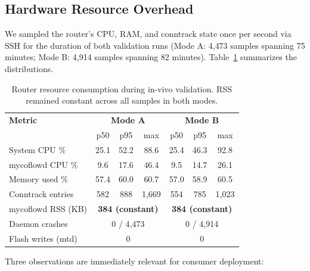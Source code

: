 \documentclass[journal,onecolumn]{IEEEtran}
\begin{document}
\subsection{Hardware Resource Overhead}
\label{sec:eval-resources}

We sampled the router's CPU, RAM, and conntrack state once per second
via SSH for the duration of both validation runs (Mode A: 4{,}473
samples spanning 75 minutes; Mode B: 4{,}914 samples spanning 82 minutes).
Table~\ref{tab:resources} summarizes the distributions.

\begin{table}[t]
\centering
\caption{Router resource consumption during in-vivo validation. RSS
remained constant across all samples in both modes.}
\label{tab:resources}
\begin{tabular}{l|ccc|ccc}
\toprule
\textbf{Metric} & \multicolumn{3}{c|}{\textbf{Mode A}} & \multicolumn{3}{c}{\textbf{Mode B}} \\
 & p50 & p95 & max & p50 & p95 & max \\
\midrule
System CPU \%       & 25.1 & 52.2 & 88.6 & 25.4 & 46.3 & 92.8 \\
mycoflowd CPU \%    & 9.6  & 17.6 & 46.4 & 9.5  & 14.7 & 26.1 \\
Memory used \%      & 57.4 & 60.0 & 60.7 & 57.0 & 58.9 & 60.5 \\
Conntrack entries   & 582  & 888  & 1{,}669 & 554 & 785 & 1{,}023 \\
\midrule
mycoflowd RSS (KB)  & \multicolumn{3}{c|}{\textbf{384 (constant)}} & \multicolumn{3}{c}{\textbf{384 (constant)}} \\
Daemon crashes      & \multicolumn{3}{c|}{0 / 4{,}473} & \multicolumn{3}{c}{0 / 4{,}914} \\
Flash writes (mtd)  & \multicolumn{3}{c|}{0} & \multicolumn{3}{c}{0} \\
\bottomrule
\end{tabular}
\end{table}

Three observations are immediately relevant for consumer deployment:
\end{document}
